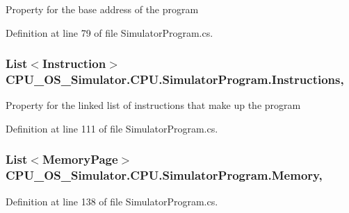 Property for the base address of the program 



Definition at line 79 of file Simulator\+Program.\+cs.

\hypertarget{class_c_p_u___o_s___simulator_1_1_c_p_u_1_1_simulator_program_ae64c462081a1806d5f194c271dbb2686}{}
\subsubsection[{Instructions}]{\setlength{\rightskip}{0pt plus 5cm}List$<${\bf Instruction}$>$ C\+P\+U\+\_\+\+O\+S\+\_\+\+Simulator.\+C\+P\+U.\+Simulator\+Program.\+Instructions\hspace{0.3cm}{\ttfamily [get]}, {\ttfamily [set]}}\label{class_c_p_u___o_s___simulator_1_1_c_p_u_1_1_simulator_program_ae64c462081a1806d5f194c271dbb2686}


Property for the linked list of instructions that make up the program 



Definition at line 111 of file Simulator\+Program.\+cs.

\hypertarget{class_c_p_u___o_s___simulator_1_1_c_p_u_1_1_simulator_program_ac3f520f751426a1e09f350096f0d2341}{}
\subsubsection[{Memory}]{\setlength{\rightskip}{0pt plus 5cm}List$<${\bf Memory\+Page}$>$ C\+P\+U\+\_\+\+O\+S\+\_\+\+Simulator.\+C\+P\+U.\+Simulator\+Program.\+Memory\hspace{0.3cm}{\ttfamily [get]}, {\ttfamily [set]}}\label{class_c_p_u___o_s___simulator_1_1_c_p_u_1_1_simulator_program_ac3f520f751426a1e09f350096f0d2341}


Definition at line 138 of file Simulator\+Program.\+cs.


